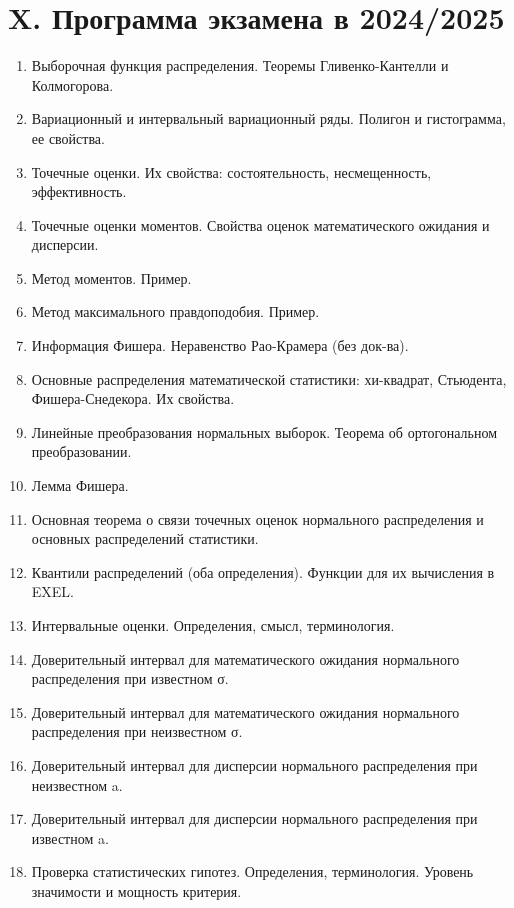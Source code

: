 \documentclass[12pt]{article}
\begin{document}

\clearpage

\section{X. Программа экзамена в 2024/2025}


\begin{enumerate}
    \item Выборочная функция распределения. Теоремы Гливенко-Кантелли и Колмогорова.
    \item Вариационный и интервальный вариационный ряды. Полигон и гистограмма, ее свойства.
    \item Точечные оценки. Их свойства: состоятельность, несмещенность, эффективность.
    \item Точечные оценки моментов. Свойства оценок математического ожидания и дисперсии.
    \item Метод моментов. Пример.
    \item Метод максимального правдоподобия. Пример.
    \item Информация Фишера. Неравенство Рао-Крамера (без док-ва).
    \item Основные распределения математической статистики: хи-квадрат, Стьюдента, Фишера-Снедекора. Их свойства.
    \item Линейные преобразования нормальных выборок. Теорема об ортогональном преобразовании.
    \item Лемма Фишера.
    \item Основная теорема о связи точечных оценок нормального распределения и основных распределений статистики.
    \item Квантили распределений (оба определения). Функции для их вычисления в EXEL.
    \item Интервальные оценки. Определения, смысл, терминология.
    \item Доверительный интервал для математического ожидания нормального распределения при известном σ.
    \item Доверительный интервал для математического ожидания нормального распределения при неизвестном σ.
    \item Доверительный интервал для дисперсии нормального распределения при неизвестном a.
    \item Доверительный интервал для дисперсии нормального распределения при известном a.
    \item Проверка статистических гипотез. Определения, терминология. Уровень значимости и мощность критерия.

\end{enumerate}
\end{document}

